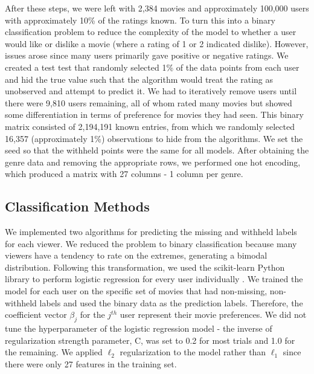 \documentclass{article} %
\begin{document}
After these steps, we were left with 2,384 movies and approximately 100,000 users with approximately 10\% of the ratings known. To turn this into a binary classification problem to reduce the complexity of the model to whether a user would like or dislike a movie (where a rating of 1 or 2 indicated dislike). However, issues arose since many users primarily gave positive or negative ratings. We created a test test that randomly selected 1\% of the data points from each user and hid the true value such that the algorithm would treat the rating as unobserved and attempt to predict it. We had to iteratively remove users until there were 9,810 users remaining, all of whom rated many movies but showed some differentiation in terms of preference for movies they had seen. This binary matrix consisted of 2,194,191 known entries, from which we randomly selected 16,357 (approximately 1\%) observations to hide from the algorithms. We set the seed so that the withheld points were the same for all models. After obtaining the genre data and removing the appropriate rows, we performed one hot encoding, which produced a matrix with 27 columns - 1 column per genre.

\subsection{Classification Methods}

We implemented two algorithms for predicting the missing and withheld labels for each viewer. We reduced the problem to binary classification because many viewers have a tendency to rate on the extremes, generating a bimodal distribution. Following this transformation, we used the scikit-learn Python library to perform logistic regression for every user individually \cite{skl}. We trained the model for each user on the specific set of movies that had non-missing, non-withheld labels and used the binary data as the prediction labels. Therefore, the coefficient vector $\beta_j$ for the $j^{th}$ user represent their movie preferences. We did not tune the hyperparameter of the logistic regression model - the inverse of regularization strength parameter, C, was set to 0.2 for most trials and 1.0 for the remaining. We applied $\ell_2$ regularization to the model rather than $\ell_1$ since there were only 27 features in the training set.
\end{document}
